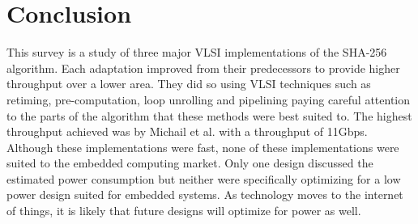 \documentclass[conference]{IEEEtran}
\begin{document}
\section{Conclusion} \label{Conclusion}
This survey is a study of three major VLSI implementations of the SHA-256 algorithm. Each adaptation improved from their predecessors to provide higher throughput over a lower area. They did so using VLSI techniques such as retiming, pre-computation, loop unrolling and pipelining paying careful attention to the parts of the algorithm that these methods were best suited to. The highest throughput achieved was by Michail et al. with a throughput of 11Gbps. Although these implementations were fast, none of these implementations were suited to the embedded computing market. Only one design discussed the estimated power consumption but neither were specifically optimizing for a low power design suited for embedded systems. As technology moves to the internet of things, it is likely that future designs will optimize for power as well. 





\end{document}
